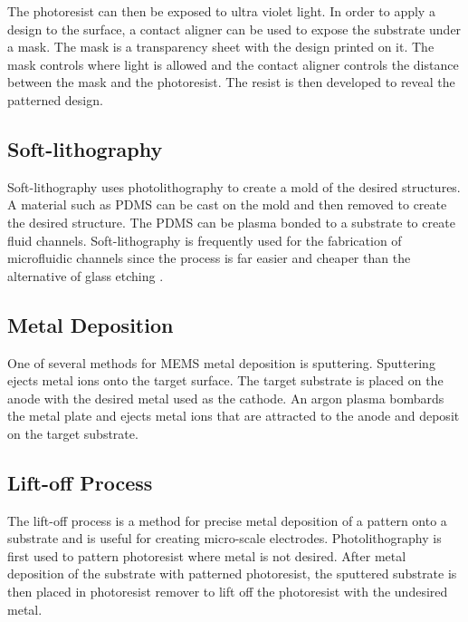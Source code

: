  \par The photoresist can then be exposed to ultra violet light. In order to apply a design to the surface, a contact aligner can be used to expose the substrate under a mask. The mask is a transparency sheet with the design printed on it. The mask controls where light is allowed and the contact aligner controls the distance between the mask and the photoresist. The resist is then developed to reveal the patterned design. 
 
 \subsection*{Soft-lithography}
 
 \par Soft-lithography uses photolithography to create a mold of the desired structures. A material such as PDMS can be cast on the mold and then removed to create the desired structure. The PDMS can be plasma bonded to a substrate to create fluid channels. Soft-lithography is frequently used for the fabrication of microfluidic channels since the process is far easier and cheaper than the alternative of glass etching \cite{whitesides_soft_2001}.
 

 
 \subsection*{Metal Deposition}
 
 \par One of several methods for MEMS metal deposition is sputtering. Sputtering ejects metal ions onto the target surface. The target substrate is placed on the anode with the desired metal used as the cathode. An argon plasma bombards the metal plate and ejects metal ions that are attracted to the anode and deposit on the target substrate. 
 

 
  \subsection*{Lift-off Process}
 
 \par The lift-off process is a method for precise metal deposition of a pattern onto a substrate and is useful for creating micro-scale electrodes. Photolithography is first used to pattern photoresist where metal is not desired. After metal deposition of the substrate with patterned photoresist, the sputtered substrate is then placed in photoresist remover to lift off the photoresist with the undesired metal.

